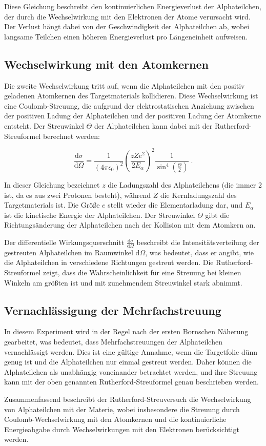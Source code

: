Diese Gleichung beschreibt den kontinuierlichen Energieverlust der Alphateilchen, der durch die Wechselwirkung mit den Elektronen der Atome verursacht wird. Der Verlust hängt dabei von der Geschwindigkeit der Alphateilchen ab, wobei langsame Teilchen einen höheren Energieverlust pro Längeneinheit aufweisen.

\subsection*{Wechselwirkung mit den Atomkernen}
Die zweite Wechselwirkung tritt auf, wenn die Alphateilchen mit den positiv geladenen Atomkernen des Targetmaterials kollidieren. Diese Wechselwirkung ist eine Coulomb-Streuung, die aufgrund der elektrostatischen Anziehung zwischen der positiven Ladung der Alphateilchen und der positiven Ladung der Atomkerne entsteht. Der Streuwinkel $\Theta$ der Alphateilchen kann dabei mit der Rutherford-Streuformel berechnet werden:

\[
\frac{\mathrm{d}\sigma}{\mathrm{d}\Omega} = \frac{1}{(4 \pi \epsilon_0)^2} \left( \frac{z Z e^2}{2 E_\alpha} \right)^2 \frac{1}{\sin^4\left(\frac{\Theta}{2}\right)}\; .
\]

In dieser Gleichung bezeichnet $z$ die Ladungszahl des Alphateilchens (die immer 2 ist, da es aus zwei Protonen besteht), während $Z$ die Kernladungszahl des Targetmaterials ist. Die Größe $e$ stellt wieder die Elementarladung dar, und $E_\alpha$ ist die kinetische Energie der Alphateilchen. Der Streuwinkel $\Theta$ gibt die Richtungsänderung der Alphateilchen nach der Kollision mit dem Atomkern an. 

Der differentielle Wirkungsquerschnitt $\frac{\mathrm{d}\sigma}{\mathrm{d}\Omega}$ beschreibt die Intensitätsverteilung der gestreuten Alphateilchen im Raumwinkel $\mathrm{d}\Omega$, was bedeutet, dass er angibt, wie die Alphateilchen in verschiedene Richtungen gestreut werden. Die Rutherford-Streuformel zeigt, dass die Wahrscheinlichkeit für eine Streuung bei kleinen Winkeln am größten ist und mit zunehmendem Streuwinkel stark abnimmt.

\subsection*{Vernachlässigung der Mehrfachstreuung}
In diesem Experiment wird in der Regel nach der ersten Bornschen Näherung gearbeitet, was bedeutet, dass Mehrfachstreuungen der Alphateilchen vernachlässigt werden. Dies ist eine gültige Annahme, wenn die Targetfolie dünn genug ist und die Alphateilchen nur einmal gestreut werden. Daher können die Alphateilchen als unabhängig voneinander betrachtet werden, und ihre Streuung kann mit der oben genannten Rutherford-Streuformel genau beschrieben werden.

Zusammenfassend beschreibt der Rutherford-Streuversuch die Wechselwirkung von Alphateilchen mit der Materie, wobei insbesondere die Streuung durch Coulomb-Wechselwirkung mit den Atomkernen und die kontinuierliche Energieabgabe durch Wechselwirkungen mit den Elektronen berücksichtigt werden.
